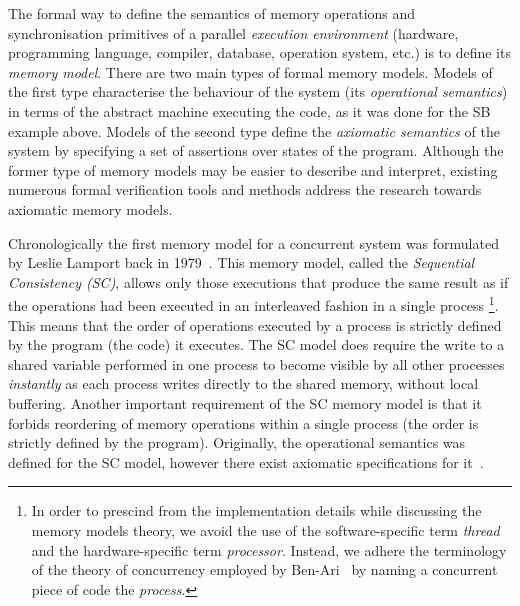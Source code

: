 The formal way to define the semantics of memory operations and synchronisation primitives of a parallel \textit{execution environment} (hardware, programming language, compiler, database, operation system, etc.) is to define its \textit{memory model}.
There are two main types of formal memory models.
Models of the first type characterise the behaviour of the system (its \textit{operational semantics}) in terms of the abstract machine executing the code, as it was done for the SB example above.
Models of the second type define the \textit{axiomatic semantics} of the system by specifying a set of assertions over states of the program.
Although the former type of memory models may be easier to describe and interpret, existing numerous formal verification tools and methods address the research towards axiomatic memory models.

Chronologically the first memory model for a concurrent system was formulated by Leslie Lamport back in 1979~\cite{lamport1979make}.
This memory model, called the \textit{Sequential Consistency (SC)}, allows only those executions that produce the same result as if the operations had been executed in an interleaved fashion in a single process%
%
\footnote{In order to prescind from the implementation details while discussing the memory models theory, we avoid the use of the software-specific term \textit{thread} and the hardware-specific term \textit{processor}.
Instead, we adhere the terminology of the theory of concurrency employed by Ben-Ari~\cite{ben2006principles} by naming a concurrent piece of code the \textit{process}.}. %
%
This means that the order of operations executed by a process is strictly defined by the program (the code) it executes.
The SC model does require the write to a shared variable performed in one process to become visible by all other processes \textit{instantly} as each process writes directly to the shared memory, without local buffering.
Another important requirement of the SC memory model is that it forbids reordering of memory operations within a single process (the order is strictly defined by the program).
Originally, the operational semantics was defined for the SC model, however there exist axiomatic specifications for it~\cite{mansky2015axiomatic}.

